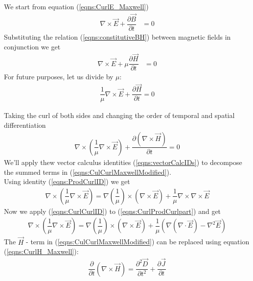 \documentclass[twocolumn,secnumarabic,amssymb, nobibnotes, aps, prd]{revtex4-1}
\begin{document}
We start from equation (\ref{eqns:CurlE_Maxwell})
\begin{align*}
\nabla \times \overrightarrow{E} + \dfrac{\partial \overrightarrow{B}}{\partial t}&= 0
\end{align*}
Substituting the relation (\ref{eqns:constitutiveBH}) between magnetic fields in conjunction we get
\begin{align*}
\nabla \times \overrightarrow{E} + \mu \dfrac{\partial  \overrightarrow{H}}{\partial t}&= 0
\end{align*}
For future purposes, let us divide by $\mu$:
\begin{align*}
\dfrac{1}{\mu} \nabla \times \overrightarrow{E} + \dfrac{\partial \overrightarrow{H}}{\partial t} = 0
\end{align*}

Taking the curl of both sides and changing the order of temporal and spatial differentiation
\begin{align}
\label{eqns:CulCurlMaxwellModified}
\nabla \times \left( \dfrac{1}{\mu} \nabla \times \overrightarrow{E} \right)  + \dfrac{\partial (\nabla \times  \overrightarrow{H})}{\partial t} = 0
\end{align}
We'll apply thew vector calculus identities (\ref{eqns:vectorCalcIDs}) to decompose the summed terms in (\ref{eqns:CulCurlMaxwellModified}).\\
Using identity (\ref{eqns:ProdCurlID}) we get
\begin{align}
\label{eqns:CurlProdCurlpart}
\nabla \times \left( \dfrac{1}{\mu} \nabla \times \overrightarrow{E} \right) = \nabla \left( \dfrac{1}{\mu} \right) \times \left(\nabla \times \overrightarrow{E} \right) + \dfrac{1}{\mu} \nabla \times \nabla \times \overrightarrow{E}
\end{align}
Now we apply (\ref{eqns:CurlCurlID}) to (\ref{eqns:CurlProdCurlpart}) and get
\begin{align}
\label{eqns:CurlProdCurlExpanded}
\nabla \times \left( \dfrac{1}{\mu} \nabla \times \overrightarrow{E} \right) = \nabla \left( \dfrac{1}{\mu} \right) \times \left(\nabla \times \overrightarrow{E} \right) + \dfrac{1}{\mu} \left( \nabla (\nabla \cdot \overrightarrow{E}) - \nabla^2 \overrightarrow{E}\right)
\end{align}
The $\overrightarrow{H}$ - term in (\ref{eqns:CulCurlMaxwellModified}) can be replaced using equation (\ref{eqns:CurlH_Maxwell}):
\begin{align}
\label{eqns:Curl_H_replaced_D}
\dfrac{\partial}{\partial t} \left( \nabla \times \overrightarrow{H}\right) = \dfrac{\partial^2 \overrightarrow{D}}{\partial t^2} + \dfrac{\partial \overrightarrow{J}}{\partial t}
\end{align}
\end{document}
